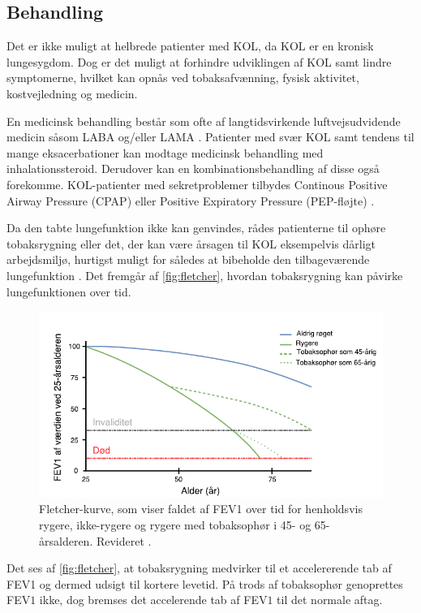 \subsection{Behandling} \label{sec:behandling}
Det er ikke muligt at helbrede patienter med KOL, da KOL er en kronisk lungesygdom. Dog er det muligt at forhindre udviklingen af KOL samt lindre symptomerne, hvilket kan opnås ved tobaksafvænning, fysisk aktivitet, kostvejledning og medicin.\cite{Basisbogen2016} 

En medicinsk behandling består som ofte af langtidsvirkende luftvejsudvidende medicin såsom LABA og/eller LAMA \cite{Sundhedsdatastyrelsen2015}. Patienter med svær KOL samt tendens til mange eksacerbationer kan modtage medicinsk behandling med inhalationssteroid. Derudover kan en kombinationsbehandling af disse også forekomme.\cite{Sundhedsdatastyrelsen2015} KOL-patienter med sekretproblemer tilbydes Continous Positive Airway Pressure (CPAP) eller Positive Expiratory Pressure (PEP-fløjte) \cite{Basisbogen2016}.

Da den tabte lungefunktion ikke kan genvindes, rådes patienterne til ophøre tobaksrygning eller det, der kan være årsagen til KOL eksempelvis dårligt arbejdsmiljø, hurtigst muligt for således at bibeholde den tilbageværende lungefunktion \cite{Basisbogen2016}. Det fremgår af \autoref{fig:fletcher}, hvordan tobaksrygning kan påvirke lungefunktionen over tid. 

\begin{figure} [H]
\centering
\includegraphics[width=1\textwidth]{figures/fletcher}
\caption{Fletcher-kurve, som viser faldet af FEV1 over tid for henholdsvis rygere, ikke-rygere og rygere med tobaksophør i 45- og 65-årsalderen. Revideret \cite{Basisbogen2016}.}
\label{fig:fletcher}
\end{figure} 

\noindent
Det ses af \autoref{fig:fletcher}, at tobaksrygning medvirker til et accelererende tab af FEV1 og dermed udsigt til kortere levetid. På trods af tobaksophør genoprettes FEV$1$ ikke, dog bremses det accelerende tab af FEV$1$ til det normale aftag.\cite{dsam2016}

